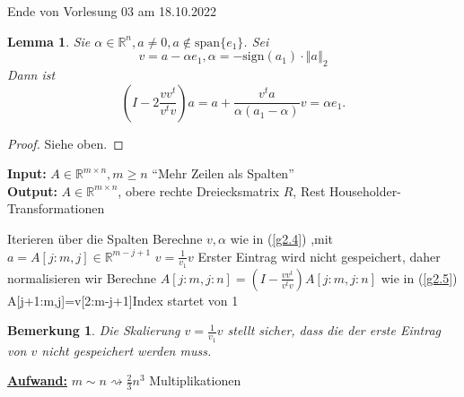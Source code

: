 \documentclass{book}
\newtheorem{lemma}[algorithm]{Lemma}
\newtheorem{remark}[algorithm]{Bemerkung}
\def\R{\mathbb{R}}
\begin{document}
        \noindent
        \xrfill[0.7ex]{1pt}Ende von Vorlesung 03 am 18.10.2022\xrfill[0.7ex]{1pt}
        
        \begin{lemma}\label{l2.18}
            Sie $\alpha\in\R^n,a\neq 0,a\notin\text{span}\{e_1\}$. 
            Sei \begin{equation}\label{g2.4}
                v=a-\alpha e_1,\alpha =-\text{sign}(a_1)\cdot \left\Vert a \right\Vert_2
            \end{equation} %
            Dann ist
            \begin{equation}\label{g2.5}
                \left(I-2\frac{vv^t}{v^tv}\right)a=a+\frac{v^ta}{\alpha(a_1-\alpha)}v=\alpha e_1.
            \end{equation}
        \end{lemma}

        \begin{proof}
            Siehe oben.
        \end{proof}

        \begin{algorithm}[H]\label{a2.19}
            \caption{}
            \textbf{Input:} $A\in\R^{m\times n},m\geq n$ ``Mehr Zeilen als Spalten''\\
            \textbf{Output:} $A\in\R^{m\times n}$, obere rechte Dreiecksmatrix $R$, Rest Householder-Transformationen
            \begin{algorithmic}
             \Comment Iterieren über die Spalten
                \State Berechne $v,\alpha$ wie in (\ref{g2.4}) ,mit $a=A[j:m,j]\in\R^{m-j+1}$
                \State $v=\frac{1}{v_1}v$ \Comment Erster Eintrag wird nicht gespeichert, daher normalisieren wir
                \State Berechne $A[j:m,j:n]=\left(I-\frac{vv^t}{v^tv}\right)A[j:m,j:n]$ wie in (\ref{g2.5})
                    \State A[j+1:m,j]=v[2:m-j+1]\Comment Index startet von 1 
                \EndIf
            \EndFor
            \end{algorithmic}
        \end{algorithm}

        \begin{remark}\label{b2.20}
            Die Skalierung $v=\frac{1}{v_1}v$ stellt sicher, dass die der erste Eintrag von $v$ nicht gespeichert werden muss.
        \end{remark}

        \underline{\textbf{Aufwand:}} $m\sim n \rightsquigarrow \frac{2}{3}n^3$ Multiplikationen
\end{document}
